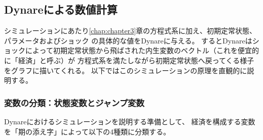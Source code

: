 
\subsection{Dynareによる数値計算}
\label{sec:chapter4_method_dynare}
シミュレーションにあたり\ref{chap:chapter3}章の方程式系に加え、初期定常状態、パラメータおよびショック
の具体的な値をDynareに与える。
するとDynareはショックによって初期定常状態から飛ばされた内生変数のベクトル（これを便宜的に「経済」と呼ぶ）が
方程式系を満たしながら初期定常状態へ戻ってくる様子をグラフに描いてくれる。
以下ではこのシミュレーションの原理を直観的に説明する。

\subsubsection{変数の分類：状態変数とジャンプ変数}
\label{sec:chapter4_method_variables_classification}
Dynareにおけるシミュレーションを説明する準備として、
経済を構成する変数を「期の添え字」によって以下の4種類に分類する。
